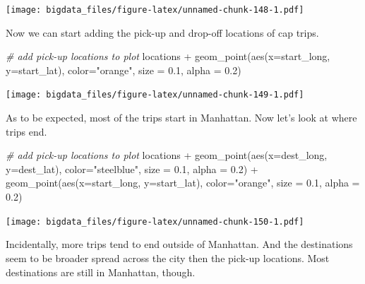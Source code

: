 \documentclass[
  12pt,
]{style/krantz}
\newenvironment{Shaded}{\begin{snugshade}}{\end{snugshade}}
\newcommand{\AttributeTok}[1]{\textcolor[rgb]{0.77,0.63,0.00}{#1}}
\newcommand{\CommentTok}[1]{\textcolor[rgb]{0.56,0.35,0.01}{\textit{#1}}}
\newcommand{\FloatTok}[1]{\textcolor[rgb]{0.00,0.00,0.81}{#1}}
\newcommand{\FunctionTok}[1]{\textcolor[rgb]{0.00,0.00,0.00}{#1}}
\newcommand{\NormalTok}[1]{#1}
\newcommand{\SpecialCharTok}[1]{\textcolor[rgb]{0.00,0.00,0.00}{#1}}
\newcommand{\StringTok}[1]{\textcolor[rgb]{0.31,0.60,0.02}{#1}}
\begin{document}
\texttt{[image: bigdata\_files/figure-latex/unnamed-chunk-148-1.pdf]}

Now we can start adding the pick-up and drop-off locations of cap trips.

\begin{Shaded}
\begin{Highlighting}[]
\CommentTok{\# add pick{-}up locations to plot}
\NormalTok{locations }\SpecialCharTok{+} 
     \FunctionTok{geom\_point}\NormalTok{(}\FunctionTok{aes}\NormalTok{(}\AttributeTok{x=}\NormalTok{start\_long, }\AttributeTok{y=}\NormalTok{start\_lat),}
                \AttributeTok{color=}\StringTok{"orange"}\NormalTok{,}
                \AttributeTok{size =} \FloatTok{0.1}\NormalTok{,}
                \AttributeTok{alpha =} \FloatTok{0.2}\NormalTok{)}
\end{Highlighting}
\end{Shaded}

\texttt{[image: bigdata\_files/figure-latex/unnamed-chunk-149-1.pdf]}

As to be expected, most of the trips start in Manhattan. Now let's look at where trips end.

\begin{Shaded}
\begin{Highlighting}[]
\CommentTok{\# add pick{-}up locations to plot}
\NormalTok{locations }\SpecialCharTok{+}
     \FunctionTok{geom\_point}\NormalTok{(}\FunctionTok{aes}\NormalTok{(}\AttributeTok{x=}\NormalTok{dest\_long, }\AttributeTok{y=}\NormalTok{dest\_lat),}
                \AttributeTok{color=}\StringTok{"steelblue"}\NormalTok{,}
                \AttributeTok{size =} \FloatTok{0.1}\NormalTok{,}
                \AttributeTok{alpha =} \FloatTok{0.2}\NormalTok{) }\SpecialCharTok{+}
     \FunctionTok{geom\_point}\NormalTok{(}\FunctionTok{aes}\NormalTok{(}\AttributeTok{x=}\NormalTok{start\_long, }\AttributeTok{y=}\NormalTok{start\_lat),}
                \AttributeTok{color=}\StringTok{"orange"}\NormalTok{,}
                \AttributeTok{size =} \FloatTok{0.1}\NormalTok{,}
                \AttributeTok{alpha =} \FloatTok{0.2}\NormalTok{)}
\end{Highlighting}
\end{Shaded}

\texttt{[image: bigdata\_files/figure-latex/unnamed-chunk-150-1.pdf]}

Incidentally, more trips tend to end outside of Manhattan. And the destinations seem to be broader spread across the city then the pick-up locations. Most destinations are still in Manhattan, though.
\end{document}
